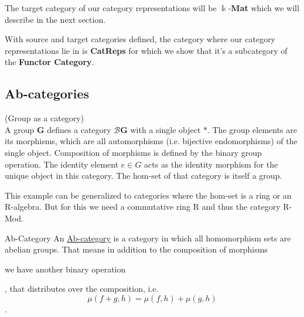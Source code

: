 The target category of our category representations will be $\Bbbk$-\textbf{Mat} which we will describe in the next section.

With source and target categories defined, the category where our category representations lie in is \textbf{CatReps} for which we
show that it's a subcategory of the \textbf{Functor Category}.

\subsection{Ab-categories}

\begin{example}{(Group as a category)}\\
\noindent A group $\mathbf{G}$ defines a category $\mathcal{B}\mathbf{G}$ with a single object $\ast$. The group elements are its morphisms, which are
all automorphisms (i.e. bijective endomorphisms) of the single object. Composition of morphisms is defined by the binary group operation.
The identity element $e \in G$ acts as the identity morphism for the unique object in this category. The hom-set of that category is itself
a group.
\end{example}

This example can be generalized to categories where the hom-set is a ring or an R-algebra. But for this we need a commutative ring R and thus
the category R-Mod.

\begin{definition}{Ab-Category}
An \ul{Ab-category} is a category in which all homomorphism sets are abelian groups. That means in addition to the composition
of morphisms  we have another binary operation , that distributes over the composition, i.e. \[\mu(f+g,h) = \mu(f,h)+\mu(g,h)\].
\end{definition}

